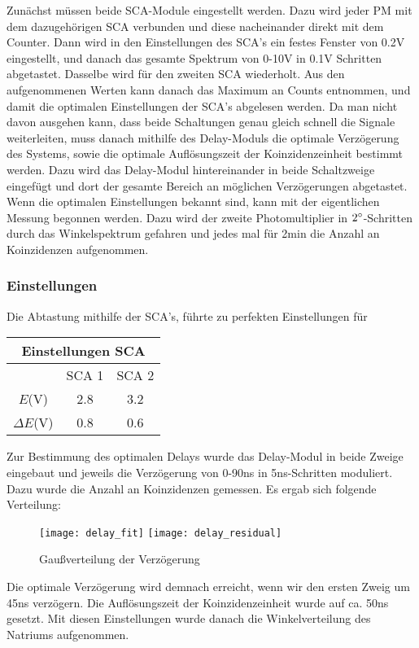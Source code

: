 \documentclass{../Misc/MontavonLaTeX/Montavon}
\newcommand{\halfwidth}{0.48\textwidth}
\begin{document}
Zunächst müssen beide SCA-Module eingestellt werden. Dazu wird jeder PM mit dem dazugehörigen SCA verbunden und diese nacheinander direkt mit dem Counter. Dann wird in den Einstellungen des SCA's ein festes Fenster von 0.2V eingestellt, und danach das gesamte Spektrum von 0-10V in 0.1V Schritten abgetastet. Dasselbe wird für den zweiten SCA wiederholt. 
Aus den aufgenommenen Werten kann danach das Maximum an Counts entnommen, und damit die optimalen Einstellungen der SCA's abgelesen werden. 
Da man nicht davon ausgehen kann, dass beide Schaltungen genau gleich schnell die Signale weiterleiten, muss danach mithilfe des Delay-Moduls die optimale Verzögerung des Systems, sowie die optimale Auflösungszeit der Koinzidenzeinheit bestimmt werden. Dazu wird das Delay-Modul hintereinander in beide Schaltzweige 
eingefügt und dort der gesamte Bereich an möglichen Verzögerungen abgetastet. Wenn die optimalen Einstellungen bekannt sind, kann mit der eigentlichen Messung begonnen werden. Dazu wird der zweite Photomultiplier in $2 ^{\circ}$-Schritten durch das Winkelspektrum gefahren und jedes mal für 2min die Anzahl an Koinzidenzen aufgenommen. 
\subsubsection{Einstellungen}
Die Abtastung mithilfe der SCA's, führte zu perfekten Einstellungen für

\begin{tabular}{|c|c|c|}
\hline 
\multicolumn{3}{|c|}{Einstellungen SCA}\tabularnewline
\hline
\hline 
 & SCA 1 & SCA 2\tabularnewline
\hline 
$E$(V) & 2.8 & 3.2\tabularnewline
\hline 
$\Delta E$(V) & 0.8 & 0.6\tabularnewline
\hline
\end{tabular}

Zur Bestimmung des optimalen Delays wurde das Delay-Modul in beide Zweige eingebaut und jeweils die Verzögerung von 0-90ns in 5ns-Schritten moduliert. Dazu wurde die Anzahl an Koinzidenzen gemessen. Es ergab sich folgende Verteilung:
\begin{figure}[htbp]
\texttt{[image: delay\_fit]}
\texttt{[image: delay\_residual]}
\caption{Gaußverteilung der Verzögerung}
\label{fig:Delay}
\end{figure}
Die optimale Verzögerung wird demnach erreicht, wenn wir den ersten Zweig um 45ns verzögern. Die Auflösungszeit der Koinzidenzeinheit wurde auf ca. 50ns gesetzt. 
Mit diesen Einstellungen wurde danach die Winkelverteilung des Natriums aufgenommen. 
\end{document}
